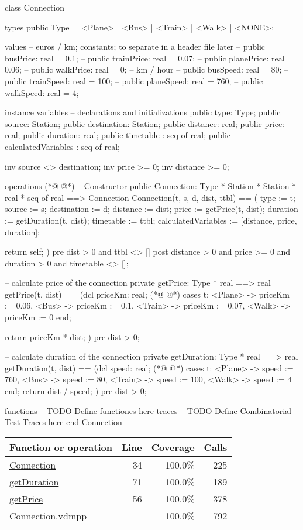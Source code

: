 \begin{vdmpp}[breaklines=true]
class Connection

types
 public Type = <Plane> | <Bus> | <Train> | <Walk> | <NONE>;

values
 -- euros / km; constants; to separate in a header file later
 -- public busPrice:   real = 0.1;
 -- public trainPrice: real = 0.07;
 -- public planePrice: real = 0.06;
 -- public walkPrice:  real = 0;
 -- km / hour
 -- public busSpeed: real   = 80;
 -- public trainSpeed: real = 100;
 -- public planeSpeed: real = 760;
 -- public walkSpeed: real  = 4;
 
instance variables
 -- declarations and initializations
 public type: Type;
 public source: Station;
 public destination: Station;
 public distance: real;
 public price: real;
 public duration: real;
 public timetable : seq of real;
 public calculatedVariables : seq of real;
 
 inv source <> destination;
 inv price >= 0;
 inv distance >= 0;
 
operations
(*@
\label{Connection:34}
@*)
 -- Constructor
 public Connection: Type * Station * Station * real * seq of real ==> Connection
 Connection(t, s, d, dist, ttbl) ==
 (
  type := t;
  source := s;
  destination := d;
  distance := dist;
  price := getPrice(t, dist);
  duration := getDuration(t, dist);
  timetable := ttbl;
  calculatedVariables := [distance, price, duration];
  
  return self;
 )
 pre dist > 0 and ttbl <> []
 post distance > 0 and price >= 0 and duration > 0 and timetable <> [];
 
 -- calculate price of the connection
 private getPrice: Type * real ==> real
 getPrice(t, dist) ==
 (dcl priceKm: real;
(*@
\label{getPrice:56}
@*)
   cases t:
    <Plane> -> priceKm := 0.06,
    <Bus> -> priceKm := 0.1,
    <Train> -> priceKm := 0.07,
    <Walk> -> priceKm := 0
   end;
   
   return priceKm * dist;
 )
 pre dist > 0;
 
 -- calculate duration of the connection
 private getDuration: Type * real ==> real
 getDuration(t, dist) ==
 (dcl speed: real;
(*@
\label{getDuration:71}
@*)
  cases t:
    <Plane> -> speed := 760,
    <Bus> -> speed := 80, 
    <Train> -> speed := 100,
    <Walk> -> speed := 4
   end;
   return dist / speed;
 )
 pre dist > 0;
  
functions
-- TODO Define functiones here
traces
-- TODO Define Combinatorial Test Traces here
end Connection
\end{vdmpp}
\bigskip
\begin{longtable}{|l|r|r|r|}
\hline
Function or operation & Line & Coverage & Calls \\
\hline
\hline
\hyperref[Connection:34]{Connection} & 34&100.0\% & 225 \\
\hline
\hyperref[getDuration:71]{getDuration} & 71&100.0\% & 189 \\
\hline
\hyperref[getPrice:56]{getPrice} & 56&100.0\% & 378 \\
\hline
\hline
Connection.vdmpp & & 100.0\% & 792 \\
\hline
\end{longtable}

